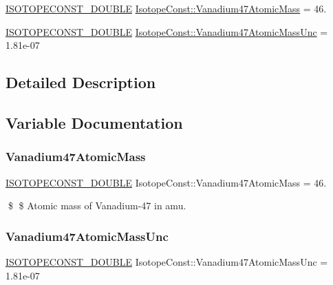 \begin{DoxyCompactItemize}
\item 
\mbox{\hyperlink{group___isotope_const-_macros_ga8f45a7272ce02c0b4c65c44636ed719a}{I\+S\+O\+T\+O\+P\+E\+C\+O\+N\+S\+T\+\_\+\+D\+O\+U\+B\+LE}} \mbox{\hyperlink{group___isotope_const-_vanadium-_v47_ga22968bc2c70cd94aff999bc200eec336}{Isotope\+Const\+::\+Vanadium47\+Atomic\+Mass}} = 46.
\item 
\mbox{\hyperlink{group___isotope_const-_macros_ga8f45a7272ce02c0b4c65c44636ed719a}{I\+S\+O\+T\+O\+P\+E\+C\+O\+N\+S\+T\+\_\+\+D\+O\+U\+B\+LE}} \mbox{\hyperlink{group___isotope_const-_vanadium-_v47_ga0dd0b3a11efeee9ef80e65b3e7a84d4a}{Isotope\+Const\+::\+Vanadium47\+Atomic\+Mass\+Unc}} = 1.\+81e-\/07
\end{DoxyCompactItemize}


\subsection{Detailed Description}


\subsection{Variable Documentation}
\mbox{\label{group___isotope_const-_vanadium-_v47_ga22968bc2c70cd94aff999bc200eec336}} 
\subsubsection{\texorpdfstring{Vanadium47\+Atomic\+Mass}{Vanadium47AtomicMass}}
{\footnotesize\ttfamily \mbox{\hyperlink{group___isotope_const-_macros_ga8f45a7272ce02c0b4c65c44636ed719a}{I\+S\+O\+T\+O\+P\+E\+C\+O\+N\+S\+T\+\_\+\+D\+O\+U\+B\+LE}} Isotope\+Const\+::\+Vanadium47\+Atomic\+Mass = 46.}

\$ \$ Atomic mass of Vanadium-\/47 in amu. \mbox{\label{group___isotope_const-_vanadium-_v47_ga0dd0b3a11efeee9ef80e65b3e7a84d4a}} 
\subsubsection{\texorpdfstring{Vanadium47\+Atomic\+Mass\+Unc}{Vanadium47AtomicMassUnc}}
{\footnotesize\ttfamily \mbox{\hyperlink{group___isotope_const-_macros_ga8f45a7272ce02c0b4c65c44636ed719a}{I\+S\+O\+T\+O\+P\+E\+C\+O\+N\+S\+T\+\_\+\+D\+O\+U\+B\+LE}} Isotope\+Const\+::\+Vanadium47\+Atomic\+Mass\+Unc = 1.\+81e-\/07}

